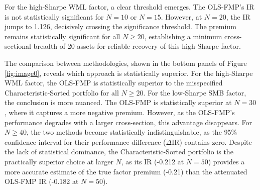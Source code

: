 \documentclass[]{article}
\begin{document}
For the high-Sharpe WML factor, a clear threshold emerges. The OLS-FMP's IR is not statistically significant for $N=10$ or $N=15$. However, at $N=20$, the IR jumps to 1.126, decisively crossing the significance threshold. The premium remains statistically significant for all $N \ge 20$, establishing a minimum cross-sectional breadth of 20 assets for reliable recovery of this high-Sharpe factor.

The comparison between methodologies, shown in the bottom panels of Figure \ref{fig:image0}, reveals which approach is statistically superior. For the high-Sharpe WML factor, the OLS-FMP is statistically superior to the misspecified Characteristic-Sorted portfolio for all $N \ge 20$. For the low-Sharpe SMB factor, the conclusion is more nuanced. The OLS-FMP is statistically superior at $N=30$, where it captures a more negative premium. However, as the OLS-FMP's performance degrades with a larger cross-section, this advantage disappears. For $N \ge 40$, the two methods become statistically indistinguishable, as the 95\% confidence interval for their performance difference ($\Delta\text{IR}$) contains zero. Despite the lack of statistical dominance, the Characteristic-Sorted portfolio is the practically superior choice at larger $N$, as its IR (-0.212 at $N=50$) provides a more accurate estimate of the true factor premium (-0.21) than the attenuated OLS-FMP IR (-0.182 at $N=50$).
\end{document}
